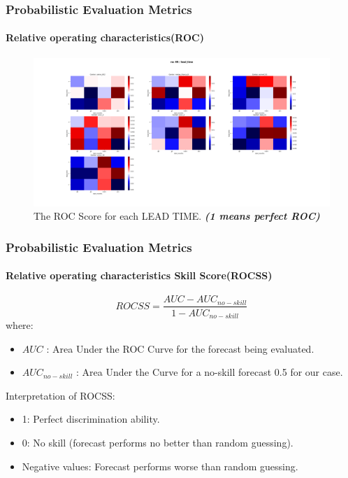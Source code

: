 \begin{frame}
\frametitle{Probabilistic Evaluation Metrics}
\framesubtitle{Relative operating characteristics(ROC)}

\begin{figure}[H]
    \centering
    \includegraphics[scale=0.15]{roc_RR_lead_time.png}
    \caption{The ROC Score for each LEAD TIME. \textbf{\textit{(1 means perfect ROC)}}}
\end{figure}
\end{frame}


\begin{frame}

\frametitle{Probabilistic Evaluation Metrics}
\framesubtitle{Relative operating characteristics Skill Score(ROCSS)}
	$$ROCSS=\frac{AUC-AUC_{no-skill}}{1-AUC_{no-skill}}$$
where:
\begin{itemize}
	\item $AUC$ : Area Under the ROC Curve for the forecast being evaluated.
	\item $AUC_{no-skill}$ : Area Under the Curve for a no-skill forecast 0.5 for our case.
\end{itemize}

Interpretation of ROCSS:
\begin{itemize}
	\item 1: Perfect discrimination ability.
	\item 0: No skill (forecast performs no better than random guessing).
	\item Negative values: Forecast performs worse than random guessing.
\end{itemize}
\end{frame}


